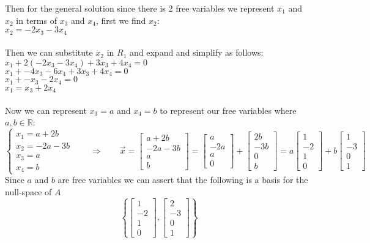 \documentclass{article}
\begin{document}
Then for the general solution since there is 2 free variables we represent $x_1$ and $x_2$ in terms of $x_3$ and $x_4$, first we find $x_2$:\\
$x_2=-2x_3-3x_4$\\\\
Then we can substitute $x_2$ in $R_1$ and expand and simplify as follows:\\
$x_1 +2(-2x_3-3x_4) +3x_3 +4x_4=0$\\
$x_1 +-4x_3-6x_4 +3x_3 +4x_4=0$\\
$x_1 +-x_3-2x_4=0$\\
$x_1=x_3+2x_4$\\\\
Now we can represent $x_3=a$ and $x_4=b$ to represent our free variables where $a,b\in\mathbb{R}$: 
$$\begin{cases}
   x_1=a+2b\\
   x_2=-2a-3b\\
   x_3=a\\
   x_4=b
\end{cases}\;\;\;\;\;\;\;\Rightarrow\;\;\;\;\;\;\;\vec{x}=\begin{bmatrix}
    a+2b\\
    -2a-3b\\
    a\\
    b
\end{bmatrix}=\begin{bmatrix}
    a\\-2a\\a\\0
\end{bmatrix}+\begin{bmatrix}
    2b\\-3b\\0\\b
\end{bmatrix}=a\begin{bmatrix}
    1\\-2\\1\\0
\end{bmatrix}+b\begin{bmatrix}
    1\\-3\\0\\1
\end{bmatrix}$$
Since $a$ and $b$ are free variables we can assert that the following is a basis for the null-space of $A$ $$\left\{\begin{bmatrix}
    1\\-2\\1\\0
\end{bmatrix},\begin{bmatrix}
    2\\-3\\0\\1
\end{bmatrix}\right\}$$
\end{document}
